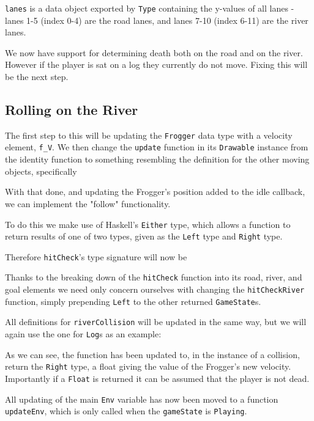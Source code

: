 \documentclass[12pt, a4paper]{report}
\begin{document}
\verb|lanes| is a data object exported by \verb|Type| containing the y-values of all lanes - lanes 1-5 (index 0-4) are the road lanes, and lanes 7-10 (index 6-11) are the river lanes.

We now have support for determining death both on the road and on the river.
However if the player is sat on a log they currently do not move.
Fixing this will be the next step.

\subsection{Rolling on the River}

The first step to this will be updating the \verb|Frogger| data type with a velocity element, \verb|f_V|.
We then change the \verb|update| function in its \verb|Drawable| instance from the identity function to something resembling the definition for the other moving objects, specifically

With that done, and updating the Frogger's position added to the idle callback, we can implement the "follow" functionality.

\par

To do this we make use of Haskell's \verb|Either| type, which allows a function to return results of one of two types, given as the \verb|Left| type and \verb|Right| type.

Therefore \verb|hitCheck|'s type signature will now be

Thanks to the breaking down of the \verb|hitCheck| function into its road, river, and goal elements we need only concern ourselves with changing the \verb|hitCheckRiver| function, simply prepending \verb|Left| to the other returned \verb|GameState|s.

All definitions for \verb|riverCollision| will be updated in the same way, but we will again use the one for \verb|Log|s as an example:

As we can see, the function has been updated to, in the instance of a collision, return the \verb|Right| type, a float giving the value of the Frogger's new velocity.
Importantly if a \verb|Float| is returned it can be assumed that the player is not dead.

\par

All updating of the main \verb|Env| variable has now been moved to a function \verb|updateEnv|, which is only called when the \verb|gameState| is \verb|Playing|.
\end{document}
